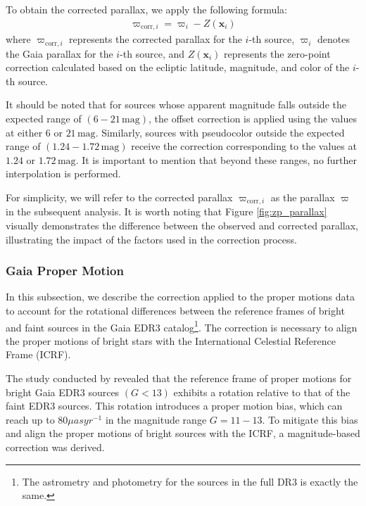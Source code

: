 \documentclass[fleqn,usenatbib,usedcolumn,useAMS]{mnras}
\begin{document}
To obtain the corrected parallax, we apply the following formula:
\begin{align*}
\varpi_{\text{corr},i} = \varpi_i - Z(\boldsymbol{x}_i)
\end{align*}
where $\varpi_{\text{corr},i}$ represents the corrected parallax for the $i$-th source, $\varpi_i$ denotes the Gaia parallax for the $i$-th source, and $Z(\boldsymbol{x}_i)$ represents the zero-point correction calculated based on the ecliptic latitude, magnitude, and color of the $i$-th source.

It should be noted that for sources whose apparent magnitude falls outside the expected range of $(6-21\,\text{mag})$, the offset correction is applied using the values at either $6$ or $21\,\text{mag}$. Similarly, sources with pseudocolor outside the expected range of $(1.24-1.72\,\text{mag})$ receive the correction corresponding to the values at $1.24$ or $1.72\,\text{mag}$. It is important to mention that beyond these ranges, no further interpolation is performed.

For simplicity, we will refer to the corrected parallax $\varpi_{\text{corr},i}$ as the parallax $\varpi$ in the subsequent analysis. It is worth noting that Figure \ref{fig:zp_parallax} visually demonstrates the difference between the observed and corrected parallax, illustrating the impact of the factors used in the correction process.

\subsubsection{Gaia Proper Motion}

In this subsection, we describe the correction applied to the proper motions data to account for the rotational differences between the reference frames of bright and faint sources in the Gaia EDR3 catalog\footnote{The astrometry and photometry for the sources in the full DR3 is exactly the same.}. The correction is necessary to align the proper motions of bright stars with the International Celestial Reference Frame (ICRF).

The study conducted by \citet{2021A&A...649A.124C} revealed that the reference frame of proper motions for bright Gaia EDR3 sources $(G < 13)$ exhibits a rotation relative to that of the faint EDR3 sources. This rotation introduces a proper motion bias, which can reach up to $80 \mu as yr^{-1}$ in the magnitude range $G = 11-13$. To mitigate this bias and align the proper motions of bright sources with the ICRF, a magnitude-based correction was derived.
\end{document}
